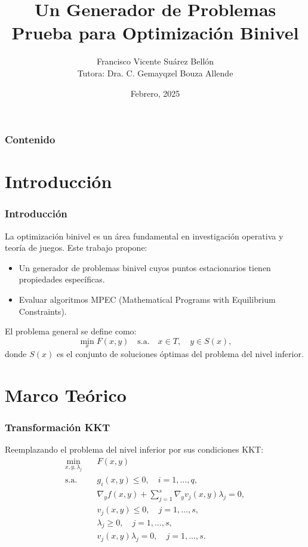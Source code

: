 \documentclass[10pt]{beamer}
\title[University of La Habana]{Un Generador de Problemas Prueba para Optimización Binivel}
\author[Francisco Vicente Suárez Bellón]{Francisco Vicente Suárez Bellón\\[10mm]{\small Tutora: Dra. C. Gemayqzel Bouza Allende }}
\date{Febrero, 2025}
\begin{document}
\frame{\titlepage}

\begin{frame}
\frametitle{Contenido}
\tableofcontents
\end{frame}

\section{Introducción}
\begin{frame}
\frametitle{Introducción}
La optimización binivel es un área fundamental en investigación operativa y teoría de juegos. Este trabajo propone:
\begin{itemize}
    \item Un generador de problemas binivel cuyos puntos estacionarios tienen propiedades específicas.
    \item Evaluar algoritmos MPEC (Mathematical Programs with Equilibrium Constraints).
\end{itemize}
El problema general se define como:
\begin{equation*}
\min_{x} F(x, y) \quad \text{s.a.} \quad x \in T, \quad y \in S(x),
\end{equation*}
donde $S(x)$ es el conjunto de soluciones óptimas del problema del nivel inferior.
\end{frame}

\section{Marco Teórico}
\begin{frame}
\frametitle{Transformación KKT}
Reemplazando el problema del nivel inferior por sus condiciones KKT:
\begin{align*}
\min_{x, y, \lambda_j} & \quad F(x, y) \\
\text{s.a.} & \quad g_i(x, y) \leq 0, \quad i = 1, \dots, q, \\
& \quad \nabla_y f(x, y) + \sum_{j=1}^s \nabla_y v_j(x, y) \lambda_j = 0, \\
& \quad v_j(x, y) \leq 0, \quad j = 1, \dots, s, \\
& \quad \lambda_j \geq 0, \quad j = 1, \dots, s, \\
& \quad v_j(x, y) \lambda_j = 0, \quad j = 1, \dots, s.
\end{align*}
\end{frame}
\end{document}
